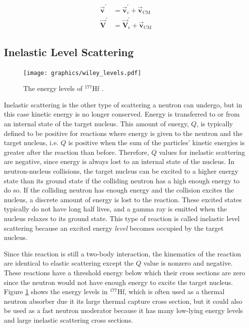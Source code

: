 \begin{equation}
\begin{split}
 \boldsymbol{\vec{v}^{\prime}}  &= \boldsymbol{\vec{v}_{\mathrm{c}}^{\prime}} + \boldsymbol{\vec{v}_{\mathrm{CM}}} \\  
 \boldsymbol{\vec{V}^{\prime}} &= \boldsymbol{\vec{V}_{\mathrm{c}}^{\prime}} + \boldsymbol{\vec{v}_{\mathrm{CM}}}
 \end{split}
\label{xformbackCM}
\end{equation}


\subsection{Inelastic Level Scattering}

\begin{figure}[h!]
  \centering
    \texttt{[image: graphics/wiley\_levels.pdf]}
     \caption[The energy levels of $^{177}$Hf.]{The energy levels of $^{177}$Hf \cite{krane}. \label{Elevels}}
\end{figure}

Inelastic scattering is the other type of scattering a neutron can undergo, but in this case kinetic energy is no longer conserved.  Energy is transferred to or from an internal state of the target nucleus.  This amount of energy, $Q$, is typically defined to be positive for reactions where energy is given to the neutron and the target nucleus, i.e. $Q$ is positive when the sum of the particles' kinetic energies is greater after the reaction than before.  Therefore, $Q$ values for inelastic scattering are negative, since energy is always lost to an internal state of the nucleus.  In neutron-nucleus collisions, the target nucleus can be excited to a higher energy state than its ground state if the colliding neutron has a high enough energy to do so.  If the colliding neutron has enough energy and the collision excites the nucleus, a discrete amount of energy is lost to the reaction.  These excited states typically do not have long half lives, and a gamma ray is emitted when the nucleus relaxes to its ground state.  This type of reaction is called inelastic level scattering because an excited energy \emph{level} becomes occupied by the target nucleus.  

Since this reaction is still a two-body interaction, the kinematics of the reaction are identical to elastic scattering except the $Q$ value is nonzero and negative.  These reactions have a threshold energy below which their cross sections are zero since the neutron would not have enough energy to excite the target nucleus.   Figure \ref{Elevels} shows the energy levels in $^{177}$Hf, which is often used as a thermal neutron absorber due it its large thermal capture cross section, but it  could also be used as a fast neutron moderator because it has many low-lying energy levels and large inelastic scattering cross sections.


